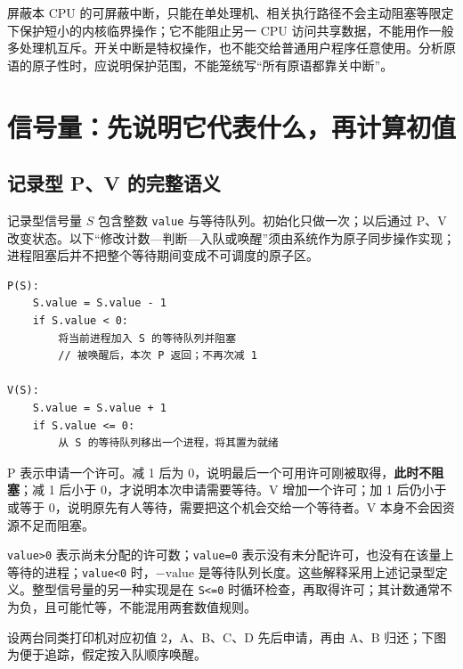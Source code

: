 屏蔽本 CPU 的可屏蔽中断，只能在单处理机、相关执行路径不会主动阻塞等限定下保护短小的内核临界操作；它不能阻止另一 CPU 访问共享数据，不能用作一般多处理机互斥。开关中断是特权操作，也不能交给普通用户程序任意使用。分析原语的原子性时，应说明保护范围，不能笼统写``所有原语都靠关中断''。

\section{信号量：先说明它代表什么，再计算初值}\label{sec-semaphore}

\subsection{记录型 P、V 的完整语义}\label{ux8bb0ux5f55ux578b-pv-ux7684ux5b8cux6574ux8bedux4e49}

记录型信号量 \(S\) 包含整数 \texttt{value} 与等待队列。初始化只做一次；以后通过 P、V 改变状态。以下``修改计数---判断---入队或唤醒''须由系统作为原子同步操作实现；进程阻塞后并不把整个等待期间变成不可调度的原子区。

\par\medskip\noindent\begin{minipage}{\linewidth}
\begin{verbatim}
P(S):
    S.value = S.value - 1
    if S.value < 0:
        将当前进程加入 S 的等待队列并阻塞
        // 被唤醒后，本次 P 返回；不再次减 1

V(S):
    S.value = S.value + 1
    if S.value <= 0:
        从 S 的等待队列移出一个进程，将其置为就绪
\end{verbatim}
\end{minipage}\par\medskip

P 表示申请一个许可。减 1 后为 0，说明最后一个可用许可刚被取得，\textbf{此时不阻塞}；减 1 后小于 0，才说明本次申请需要等待。V 增加一个许可；加 1 后仍小于或等于 0，说明原先有人等待，需要把这个机会交给一个等待者。V 本身不会因资源不足而阻塞。

\texttt{value\textgreater{}0} 表示尚未分配的许可数；\texttt{value=0} 表示没有未分配许可，也没有在该量上等待的进程；\texttt{value\textless{}0} 时，\(-\mathrm{value}\) 是等待队列长度。这些解释采用上述记录型定义。整型信号量的另一种实现是在 \texttt{S\textless{}=0} 时循环检查，再取得许可；其计数通常不为负，且可能忙等，不能混用两套数值规则。

设两台同类打印机对应初值 2，A、B、C、D 先后申请，再由 A、B 归还；下图为便于追踪，假定按入队顺序唤醒。

